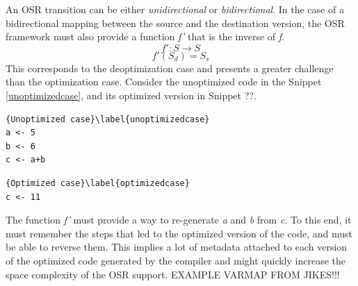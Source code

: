 An OSR transition can be either \textit{unidirectional} or \textit{bidirectional}.
In the case of a bidirectional mapping between the source and the destination version, the OSR framework must also provide a function \textit{f'} that is the inverse of \textit{f}.  
\[f': S \rightarrow S\]
\[f'(S_d) = S_s\]
This corresponds to the deoptimization case and presents a greater challenge than the optimization case.
Consider the unoptimized code in the Snippet \ref{unoptimizedcase}, and its optimized version in Snippet ??.

\begin{lstlisting}[caption=Unoptimized case]{Unoptimized case}\label{unoptimizedcase}
a <- 5
b <- 6
c <- a+b
\end{lstlisting}
\begin{lstlisting}[caption=Optimized case]{Optimized case}\label{optimizedcase}
c <- 11
\end{lstlisting}

The function \textit{f'} must provide a way to re-generate \textit{a} and \textit{b} from \textit{c}. 
To this end, it must remember the steps that led to the optimized version of the code, and must be able to reverse them.
This implies a lot of metadata attached to each version of the optimized code generated by the compiler and might quickly increase the space complexity of the OSR support.
EXAMPLE VARMAP FROM JIKES!!! 

